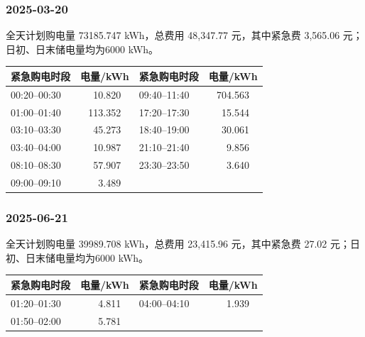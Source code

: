 \subsubsection*{2025-03-20}

\begin{center}\small\quad\end{center}
全天计划购电量 73185.747 kWh，总费用 48,347.77 元，其中紧急费 3,565.06 元；日初、日末储电量均为6000 kWh。
\begin{center}\small
\begin{tabular}{lrlr}\toprule
紧急购电时段 & 电量/kWh & 紧急购电时段 & 电量/kWh\\\midrule
00:20--00:30 & 10.820 \ & 09:40--11:40 & 704.563 \ \\
01:00--01:40 & 113.352 \ & 17:20--17:30 & 15.544 \ \\
03:10--03:30 & 45.273 \ & 18:40--19:00 & 30.061 \ \\
03:40--04:00 & 10.987 \ & 21:10--21:40 & 9.856 \ \\
08:10--08:30 & 57.907 \ & 23:30--23:50 & 3.640 \ \\
09:00--09:10 & 3.489 \ &  &  \\
\bottomrule\end{tabular}\end{center}

\subsubsection*{2025-06-21}

\begin{center}\small\quad\end{center}
全天计划购电量 39989.708 kWh，总费用 23,415.96 元，其中紧急费 27.02 元；日初、日末储电量均为6000 kWh。
\begin{center}\small
\begin{tabular}{lrlr}\toprule
紧急购电时段 & 电量/kWh & 紧急购电时段 & 电量/kWh\\\midrule
01:20--01:30 & 4.811 \ & 04:00--04:10 & 1.939 \ \\
01:50--02:00 & 5.781 \ &  &  \\
\bottomrule\end{tabular}\end{center}

